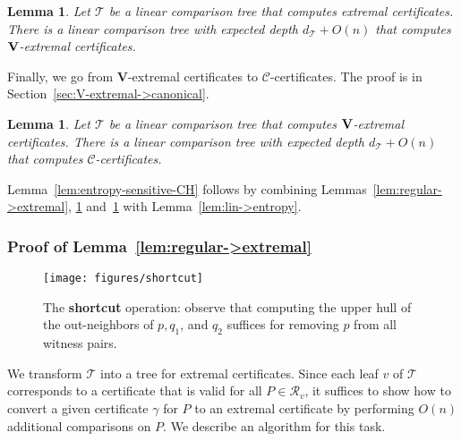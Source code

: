 \documentclass[letterpaper,11pt]{article}
\newtheorem{lemma}[theorem]{Lemma}
\newcommand{\cC}{\mathcal{C}}
\newcommand{\cR}{\mathcal{R}}
\newcommand{\cT}{\mathcal{T}}
\begin{document}
\begin{lemma}\label{lem:extremal->V-extremal}
  Let $\cT$ be a linear comparison tree 
  that computes extremal certificates.
  There is a linear comparison tree 
  with expected depth $d_\cT + O(n)$ that computes 
  $\textup{\textbf{V}}$-extremal certificates.
\end{lemma}

Finally, we go from
$\textbf{V}$-extremal certificates to 
$\cC$-certificates. 
The proof is in Section~\ref{sec:V-extremal->canonical}.

\begin{lemma}\label{lem:V-extremal->canonical}
  Let $\cT$ be a linear comparison tree 
  that computes $\textup{\textbf{V}}$-extremal 
  certificates. There is a linear 
  comparison tree with expected depth 
  $d_{\cT} + O(n)$ that computes $\cC$-certificates. 
\end{lemma}

Lemma~\ref{lem:entropy-sensitive-CH} follows by
combining Lemmas~\ref{lem:regular->extremal},
\ref{lem:extremal->V-extremal} 
and~\ref{lem:V-extremal->canonical}
with Lemma~\ref{lem:lin->entropy}.

\subsubsection{Proof of Lemma~\ref{lem:regular->extremal}}
\label{sec:regular->extremal}
 
\begin{figure}
  \centering
  \texttt{[image: figures/shortcut]}
  \caption{ The \textbf{shortcut} operation: 
    observe that computing the upper hull 
    of the out-neighbors of $p, q_1$, and $q_2$ suffices
    for removing $p$ from all witness pairs.}
  \label{fig:shortcut}
\end{figure}

We transform $\cT$ into a tree for 
extremal certificates. Since each leaf 
$v$ of $\cT$ corresponds to a certificate 
that is valid for all $P \in \cR_v$, it suffices 
to show how to convert a given certificate 
$\gamma$ for $P$ to an extremal 
certificate by performing $O(n)$ additional 
comparisons on $P$. We 
describe an algorithm for this task.
\end{document}
